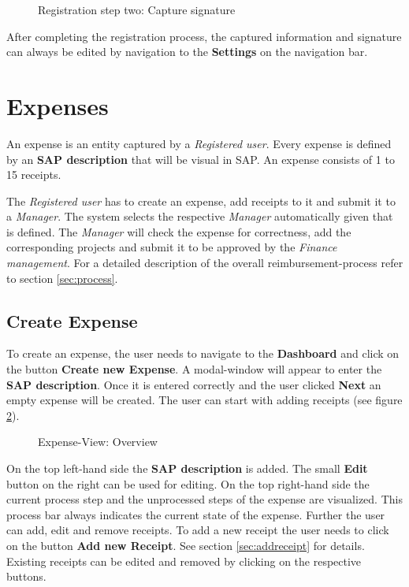 \begin{figure}[H]
    \centering
    \caption{Registration step two: Capture signature}
    \label{fig:registration-step02}
\end{figure}

After completing the registration process, the captured information and signature can always be edited by navigation to the \textbf{Settings} on the navigation bar.

\section*{Expenses}

An expense is an entity captured by a \textit{Registered user}. Every expense is defined by an \textbf{SAP description} that will be visual in SAP. An expense consists of 1 to 15 receipts.

The \textit{Registered user} has to create an expense, add receipts to it and submit it to a \textit{Manager}. The system selects the respective \textit{Manager} automatically given that is defined. The \textit{Manager} will check the expense for correctness, add the corresponding projects and submit it to be approved by the \textit{Finance management}. For a detailed description of the overall reimbursement-process refer to section \ref{sec:process}.

\subsection*{Create Expense}

To create an expense, the user needs to navigate to the \textbf{Dashboard} and click on the button \textbf{Create new Expense}. A modal-window will appear to enter the \textbf{SAP description}. Once it is entered correctly and the user clicked \textbf{Next} an empty expense will be created. The user can start with adding receipts (see figure \ref{fig:expensesitems-overview}).

\begin{figure}[H]
    \centering
    \caption{Expense-View: Overview}
    \label{fig:expensesitems-overview}
\end{figure}

On the top left-hand side the \textbf{SAP description} is added. The small \textbf{Edit} button on the right can be used for editing. On the top right-hand side the current process step and the unprocessed steps of the expense are visualized. This process bar always indicates the current state of the expense.\newline
Further the user can add, edit and remove receipts. To add a new receipt the user needs to click on the button \textbf{Add new Receipt}. See section \ref{sec:addreceipt} for details. \newline
Existing receipts can be edited and removed by clicking on the respective buttons.


